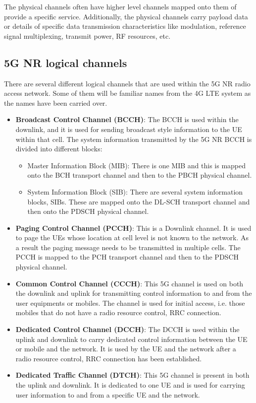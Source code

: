 The physical channels often have higher level channels mapped onto them of provide a specific service. Additionally, the physical channels carry payload data or details of specific data transmission characteristics like modulation, reference signal multiplexing, transmit power, RF resources, etc.

\subsection{5G NR logical channels}
There are several different logical channels that are used within the 5G NR radio access network. Some of them will be familiar names from the 4G LTE system as the names have been carried over.
\begin{itemize}
    \item \textbf{Broadcast Control Channel (BCCH)}: The BCCH is used within the downlink, and it is used for sending broadcast style information to the UE within that cell. The system information transmitted by the 5G NR BCCH is divided into different blocks:
    \begin{itemize}
        \item Master Information Block (MIB): There is one MIB and this is mapped onto the BCH transport channel and then to the PBCH physical channel.
        \item System Information Block (SIB): There are several system information blocks, SIBs. These are mapped onto the DL-SCH transport channel and then onto the PDSCH physical channel.
    \end{itemize}
    \item \textbf{Paging Control Channel (PCCH)}: This is a Downlink channel. It is used to page the UEs whose location at cell level is not known to the network. As a result the paging message needs to be transmitted in multiple cells. The PCCH is mapped to the PCH transport channel and then to the PDSCH physical channel.
    \item \textbf{Common Control Channel (CCCH)}: This 5G channel is used on both the downlink and uplink for transmitting control information to and from the user equipments or mobiles. The channel is used for initial access, i.e. those mobiles that do not have a radio resource control, RRC connection.
    \item \textbf{Dedicated Control Channel (DCCH)}: The DCCH is used within the uplink and downlink to carry dedicated control information between the UE or mobile and the network. It is used by the UE and the network after a radio resource control, RRC connection has been established.
    \item \textbf{Dedicated Traffic Channel (DTCH)}: This 5G channel is present in both the uplink and downlink. It is dedicated to one UE and is used for carrying user information to and from a specific UE and the network.
\end{itemize}

